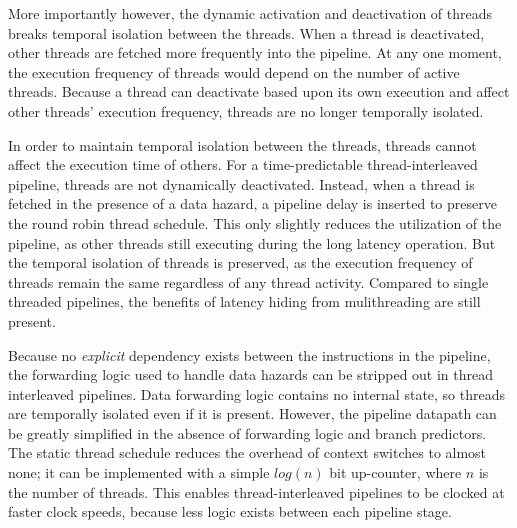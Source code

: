 More importantly however, the dynamic activation and deactivation of threads breaks temporal isolation between the threads.   
When a thread is deactivated, other threads are fetched more frequently into the pipeline.
At any one moment, the execution frequency of threads would depend on the number of active threads. 
Because a thread can deactivate based upon its own execution and affect other threads' execution frequency, threads are no longer temporally isolated.

In order to maintain temporal isolation between the threads, threads cannot affect the execution time of others.
For a time-predictable thread-interleaved pipeline, threads are not dynamically deactivated.
Instead, when a thread is fetched in the presence of a data hazard, a pipeline delay is inserted to preserve the round robin thread schedule.
This only slightly reduces the utilization of the pipeline, as other threads still executing during the long latency operation.
But the temporal isolation of threads is preserved, as the execution frequency of threads remain the same regardless of any thread activity.  
Compared to single threaded pipelines, the benefits of latency hiding from mulithreading are still present.


Because no \emph{explicit} dependency exists between the instructions in the pipeline, the forwarding logic used to handle data hazards can be stripped out in thread interleaved pipelines. 
Data forwarding logic contains no internal state, so threads are temporally isolated even if it is present.   
However, the pipeline datapath can be greatly simplified in the absence of forwarding logic and branch predictors.
The static thread schedule reduces the overhead of context switches to almost none; it can be implemented with a simple $log(n)$ bit up-counter, where $n$ is the number of threads.     
This enables thread-interleaved pipelines to be clocked at faster clock speeds, because less logic exists between each pipeline stage.
  
